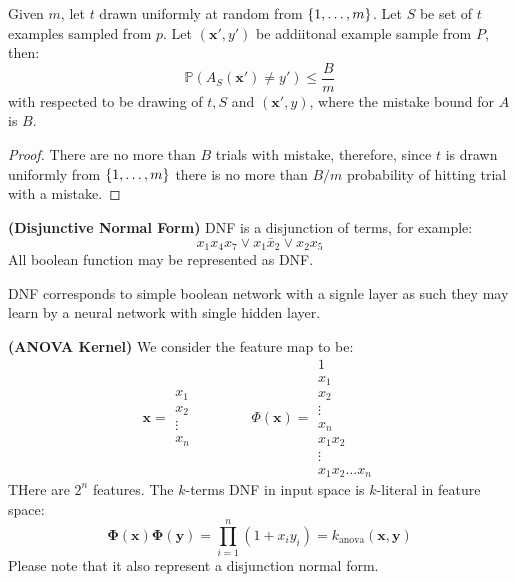 \begin{theorem}
    Given $m$, let $t$ drawn uniformly at random from $\left\{ 1,\dots,m \right\}$. Let $S$ be set of $t$ examples sampled from $p$. Let $(\boldsymbol x', y')$ be addiitonal example sample from $P$, then:
    \begin{equation*}
         \mathbb{P}(A_S(\boldsymbol x') \ne y') \le \frac{B}{m}
    \end{equation*}
    with respected to be drawing of $t, S$ and $(\boldsymbol x', y)$, where the mistake bound for $A$ is $B$.
\end{theorem} 
\begin{proof}
    There are no more than $B$ trials with mistake, therefore, since $t$ is drawn uniformly from $\left\{ 1,\dots,m \right\}$ there is no more than $B/m$ probability of hitting trial with a mistake. 
\end{proof}

\begin{definition}{\textbf{(Disjunctive Normal Form)}}
    DNF is a disjunction of terms, for example: 
    \begin{equation*}
        x_1x_4x_7\vee x_1\bar{x}_2 \vee x_2x_5
    \end{equation*}
    All boolean function may be represented as DNF. 
\end{definition}

\begin{remark}
    DNF corresponds to simple boolean network with a signle layer as such they may learn by a neural network with single hidden layer. 
\end{remark}

\begin{definition}{\textbf{(ANOVA Kernel)}}
    We consider the feature map to be:
    \begin{equation*}
        \boldsymbol x = \begin{matrix}
            x_1 \\ x_2 \\ \vdots \\ x_n
        \end{matrix} \qquad \qquad \Phi(\boldsymbol x) = \begin{matrix}
            1 \\ x_1 \\ x_2 \\ \vdots \\ x_n \\ x_1x_2 \\ \vdots \\ x_1x_2\dots x_n
        \end{matrix}
    \end{equation*}
    THere are $2^n$ features. The $k$-terms DNF in input space is $k$-literal in feature space:
    \begin{equation*}
        \boldsymbol \Phi(\boldsymbol x) \boldsymbol \Phi(\boldsymbol y) = \prod^n_{i=1}(1+x_iy_i) = k_\text{anova}(\boldsymbol x, \boldsymbol y)
    \end{equation*}
    Please note that it also represent a disjunction normal form. 
\end{definition}

